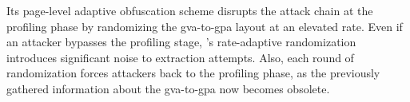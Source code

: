 	Its page-level adaptive obfuscation scheme disrupts the attack chain at the profiling phase by randomizing the \gls{gva}-to-\gls{gpa} layout at an elevated rate.
	Even if an attacker bypasses the profiling stage, \thename's rate-adaptive randomization introduces significant noise to extraction attempts.
	Also, each round of randomization forces attackers back to the profiling phase, as the previously gathered information about the \gls{gva}-to-\gls{gpa} now becomes obsolete.
\fi
